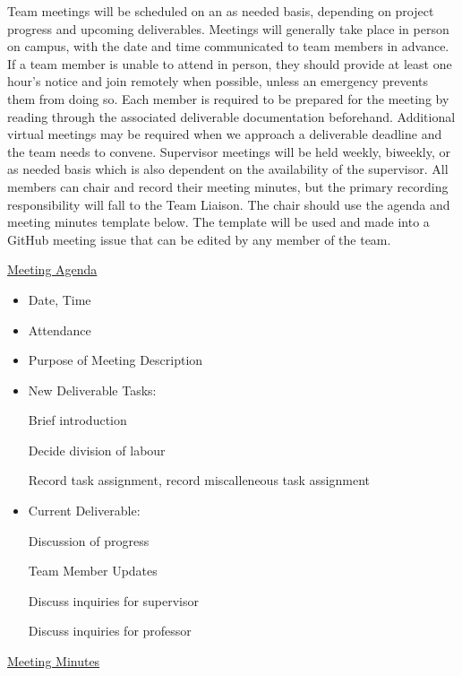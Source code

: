 \documentclass{article}
\begin{document}
Team meetings will be scheduled on an as needed basis,
depending on project progress and upcoming deliverables.
Meetings will generally take place in person on campus,
with the date and time communicated to team members in
advance. If a team member is unable to attend in person,
they should provide at least one hour's notice and join
remotely when possible, unless an emergency prevents them
from doing so. Each member is required 
to be prepared for the meeting by reading through the associated deliverable 
documentation beforehand. Additional virtual meetings may be required when we approach 
a deliverable deadline and the team needs to convene. Supervisor meetings will be 
held weekly, biweekly, or as needed basis which is also dependent on the availability 
of the supervisor. All members can chair and record their meeting minutes, but the 
primary recording responsibility will fall to the Team Liaison. The chair should use 
the agenda and meeting minutes template below. The template will be used and made into 
a GitHub meeting issue that can be edited by any member of the team.

\underline{Meeting Agenda}

\begin{itemize}
  \item Date, Time
  \item Attendance
  \item Purpose of Meeting Description
  \item New Deliverable Tasks: \par
  Brief introduction \par
  Decide division of labour \par
  Record task assignment, record miscalleneous task assignment \par
  \item Current Deliverable: \par
  Discussion of progress \par
  Team Member Updates \par
  Discuss inquiries for supervisor \par
  Discuss inquiries for professor \par
\end{itemize}

\underline{Meeting Minutes}
\end{document}
